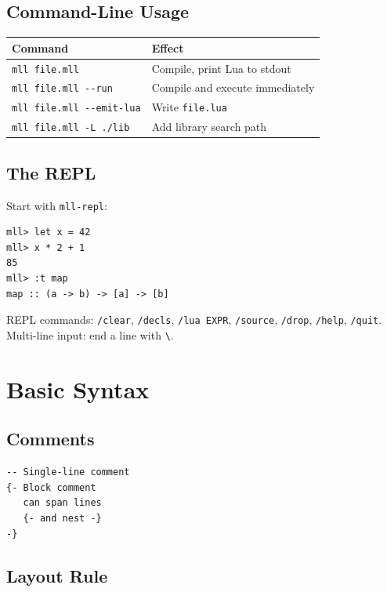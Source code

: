 \documentclass[11pt,a4paper]{article}
\begin{document}
\subsection{Command-Line Usage}

\begin{tabular}{@{}ll@{}}
\toprule
\textbf{Command} & \textbf{Effect} \\
\midrule
\texttt{mll file.mll}            & Compile, print Lua to stdout \\
\texttt{mll file.mll -{}-run}     & Compile and execute immediately \\
\texttt{mll file.mll -{}-emit-lua} & Write \texttt{file.lua} \\
\texttt{mll file.mll -L ./lib}   & Add library search path \\
\bottomrule
\end{tabular}

\subsection{The REPL}

Start with \texttt{mll-repl}:

\begin{lstlisting}[language={}]
mll> let x = 42
mll> x * 2 + 1
85
mll> :t map
map :: (a -> b) -> [a] -> [b]
\end{lstlisting}

REPL commands: \texttt{/clear}, \texttt{/decls}, \texttt{/lua EXPR},
\texttt{/source}, \texttt{/drop}, \texttt{/help}, \texttt{/quit}.
Multi-line input: end a line with \texttt{\textbackslash}.

\section{Basic Syntax}

\subsection{Comments}

\begin{lstlisting}
-- Single-line comment
{- Block comment
   can span lines
   {- and nest -}
-}
\end{lstlisting}

\subsection{Layout Rule}
\end{document}
